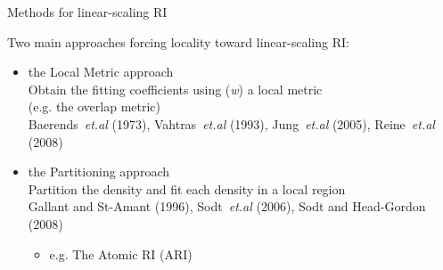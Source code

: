 \begin{frame}{Methods for linear-scaling RI}
  \footnotesize

  Two main approaches forcing locality toward linear-scaling RI:
  \begin{itemize}
  \item {\red the Local Metric approach}
    \\Obtain the fitting coefficients using (\textit{w}) a local metric
    \\(e.g. the overlap metric)
    \\{\tiny {\blue Baerends~\emph{et.al} (1973), Vahtras~\emph{et.al} (1993), Jung~\emph{et.al} (2005), Reine~\emph{et.al} (2008)} }
  \item {\red the Partitioning approach}
    \\Partition the density and fit each density in a local region 
    \\{\tiny {\blue Gallant and St-Amant (1996), Sodt~\emph{et.al} (2006), Sodt and Head-Gordon (2008)} }
    \begin{itemize}
  \footnotesize
      \item e.g. The Atomic RI (ARI)
    \end{itemize}
  \end{itemize}
\end{frame}

\frametitle{}
\framesubtitle{}

